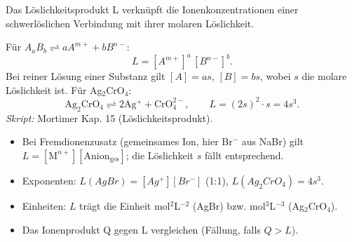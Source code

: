 

Das Löslichkeitsprodukt L verknüpft die Ionenkonzentrationen einer
schwerlöslichen Verbindung mit ihrer molaren Löslichkeit.

\begin{werkzeugkasten}[Löslichkeitsprodukt]
Für $A_aB_b\rightleftharpoons aA^{m+}+bB^{n-}$:
\[
  L = [A^{m+}]^a\,[B^{n-}]^b .
\]
Bei reiner Lösung einer Substanz gilt $[A]=a s$, $[B]=b s$, wobei $s$ die
molare Löslichkeit ist. Für Ag$_2$CrO$_4$:
\[
  \mathrm{Ag_2CrO_4 \rightleftharpoons 2 Ag^+ + CrO_4^{2-}},\qquad
  L = (2s)^2\cdot s = 4s^3.
\]
\textit{Skript:} Mortimer Kap. 15 (Löslichkeitsprodukt).
\end{werkzeugkasten}

\begin{achtung}
\begin{itemize}
  \item Bei Fremdionenzusatz (gemeinsames Ion, hier Br$^-$ aus NaBr) gilt
        $L=[\text{M}^{n+}][\text{Anion}_{\text{ges}}]$; die Löslichkeit $s$
        fällt entsprechend.
  \item Exponenten: $L(AgBr)=[Ag^+][Br^-]$ (1:1), $L(Ag_2CrO_4)=4s^3$.
  \item Einheiten: $L$ trägt die Einheit mol$^2$L$^{-2}$ (AgBr) bzw.
        mol$^3$L$^{-3}$ (Ag$_2$CrO$_4$).
  \item Das Ionenprodukt Q gegen L vergleichen (Fällung, falls $Q>L$).
\end{itemize}
\end{achtung}
